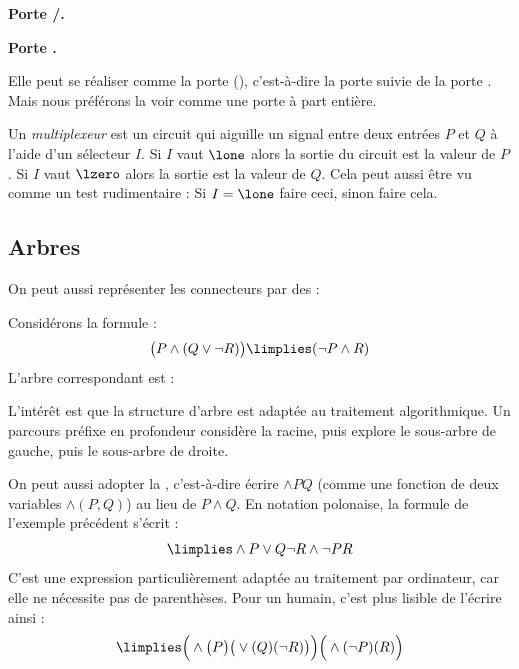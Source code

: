 \documentclass[11pt,class=report,crop=false]{standalone}
\begin{document}
\textbf{Porte \tor/.}



\textbf{Porte .}
	
Elle peut se réaliser comme la porte (), c'est-à-dire la porte  suivie de la porte .
Mais nous préférons la voir comme une porte à part entière. 



\begin{exemple}
Un \emph{multiplexeur} est un circuit qui aiguille un signal entre deux entrées $P$ et $Q$ à l'aide d'un sélecteur $I$.
Si $I$ vaut $\lone$ alors la sortie du circuit est la valeur de $P$.
Si $I$ vaut $\lzero$ alors la sortie est la valeur de $Q$.
Cela peut aussi être vu comme un test rudimentaire : \og{}Si $I=\lone$ faire ceci, sinon faire cela.\fg{}

\end{exemple}

\subsection{Arbres}

On peut aussi représenter les connecteurs par des  :



\begin{exemple}
Considérons la formule :
\[	\big( P \land (Q \lor \lnot R) \big) \limplies (\lnot P \land R) \]
L'arbre correspondant est :
\end{exemple}

L'intérêt est que la structure d'arbre est adaptée au traitement algorithmique.
Un parcours préfixe en profondeur considère la racine, puis explore le sous-arbre de gauche, puis le sous-arbre de droite.

\medskip

On peut aussi adopter la , c'est-à-dire écrire $\land P Q$ (comme une fonction de deux variables $\land(P,Q)$) au lieu de $P \land Q$.
En notation polonaise, la formule de l'exemple précédent s'écrit :
\[
\limplies \land P \lor Q \lnot R \land \lnot P R 
\]
C'est une expression particulièrement adaptée au traitement par ordinateur, car elle ne nécessite pas de parenthèses.
Pour un humain, c'est plus lisible de l'écrire ainsi :
\[
\limplies \Big( \land \big(P\big) \big(\lor (Q) (\lnot R)\big) \Big)  \Big(\land (\lnot P) (R)\Big) 
\]
\end{document}
